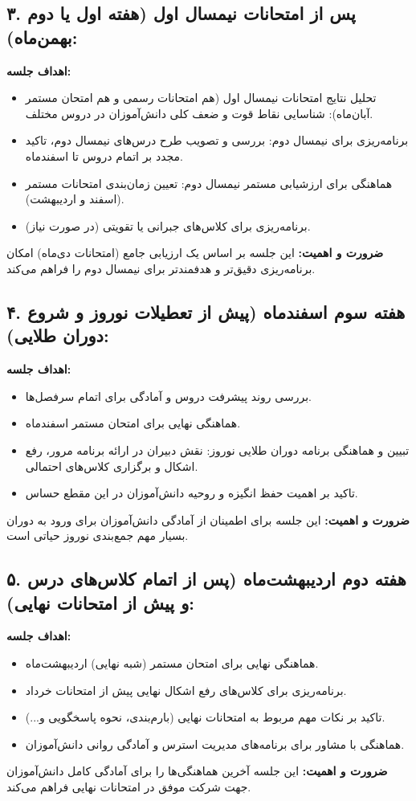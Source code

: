 \documentclass[a4paper]{article}
\begin{document}
\subsection*{۳. پس از امتحانات نیمسال اول (هفته اول یا دوم بهمن‌ماه):}
\textbf{اهداف جلسه:}
\begin{itemize}
    \item تحلیل نتایج امتحانات نیمسال اول (هم امتحانات رسمی و هم امتحان مستمر آبان‌ماه): شناسایی نقاط قوت و ضعف کلی دانش‌آموزان در دروس مختلف.
    \item برنامه‌ریزی برای نیمسال دوم: بررسی و تصویب طرح درس‌های نیمسال دوم، تاکید مجدد بر اتمام دروس تا اسفندماه.
    \item هماهنگی برای ارزشیابی مستمر نیمسال دوم: تعیین زمان‌بندی امتحانات مستمر (اسفند و اردیبهشت).
    \item برنامه‌ریزی برای کلاس‌های جبرانی یا تقویتی (در صورت نیاز).
\end{itemize}
\textbf{ضرورت و اهمیت:} این جلسه بر اساس یک ارزیابی جامع (امتحانات دی‌ماه) امکان برنامه‌ریزی دقیق‌تر و هدفمندتر برای نیمسال دوم را فراهم می‌کند.
\medskip
\subsection*{۴. هفته سوم اسفندماه (پیش از تعطیلات نوروز و شروع دوران طلایی):}
\textbf{اهداف جلسه:}
\begin{itemize}
    \item بررسی روند پیشرفت دروس و آمادگی برای اتمام سرفصل‌ها.
    \item هماهنگی نهایی برای امتحان مستمر اسفندماه.
    \item تبیین و هماهنگی برنامه دوران طلایی نوروز: نقش دبیران در ارائه برنامه مرور، رفع اشکال و برگزاری کلاس‌های احتمالی.
    \item تاکید بر اهمیت حفظ انگیزه و روحیه دانش‌آموزان در این مقطع حساس.
\end{itemize}
\textbf{ضرورت و اهمیت:} این جلسه برای اطمینان از آمادگی دانش‌آموزان برای ورود به دوران بسیار مهم جمع‌بندی نوروز حیاتی است.
\medskip
\subsection*{۵. هفته دوم اردیبهشت‌ماه (پس از اتمام کلاس‌های درس و پیش از امتحانات نهایی):}
\textbf{اهداف جلسه:}
\begin{itemize}
    \item هماهنگی نهایی برای امتحان مستمر (شبه نهایی) اردیبهشت‌ماه.
    \item برنامه‌ریزی برای کلاس‌های رفع اشکال نهایی پیش از امتحانات خرداد.
    \item تاکید بر نکات مهم مربوط به امتحانات نهایی (بارم‌بندی، نحوه پاسخگویی و...).
    \item هماهنگی با مشاور برای برنامه‌های مدیریت استرس و آمادگی روانی دانش‌آموزان.
\end{itemize}
\textbf{ضرورت و اهمیت:} این جلسه آخرین هماهنگی‌ها را برای آمادگی کامل دانش‌آموزان جهت شرکت موفق در امتحانات نهایی فراهم می‌کند.
\bigskip
\end{document}
